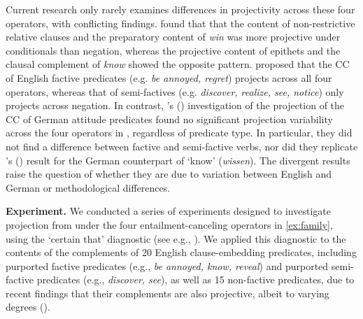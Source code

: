 \documentclass[12pt, a4paper]{article}
\newcommand{\posscite}[1]{\citeauthor{#1}'s (\citeyear{#1})}
\begin{document}
	\vspace{-.5\baselineskip}
	\noindent  Current research only rarely examines differences in projectivity across these four operators, with conflicting findings.
	\citet{smith_relationship_2014} found that that the content of non-restrictive relative clauses and the preparatory content of \emph{win} was more projective under conditionals than negation, whereas the projective content of epithets and the clausal complement of \emph{know} showed the opposite pattern.
	\citet{karttunen_observations_1971} proposed that the CC of English factive predicates (e.g. \emph{be annoyed, regret}) projects across all four operators, whereas that of semi-factives (e.g. \emph{discover, realize, see, notice}) only projects across negation.
	In contrast, \posscite{sieker_projective_2022} investigation of the projection of the CC of German attitude predicates found no significant projection variability across the four operators in \Last, regardless of predicate type. In particular, they did not find a difference between factive and semi-factive verbs, nor did they replicate \posscite{smith_relationship_2014} result for the German counterpart of `know' (\emph{wissen}).
	The divergent results raise the question of whether they are due to variation between English and German or methodological differences.


\noindent
{\bfseries Experiment.}
	We conducted a series of experiments designed to investigate projection from under the four entailment-canceling operators in \ref{ex:family}, using the `certain that' diagnostic (see e.g., \citealp{tonhauser_how_2018,djarv_prosodic_2017,mahler_social_2020,sieker_projective_2022}). We applied this diagnostic to the contents of the complements of 20 English clause-embedding predicates, including purported factive predicates (e.g., \emph{be annoyed, know, reveal}) and purported semi-factive predicates (e.g., \emph{discover, see}),
	as well as 15 non-factive predicates, due to recent findings that their complements are also projective, albeit to varying degrees (\citealt{degen_are_2022}).
\end{document}
